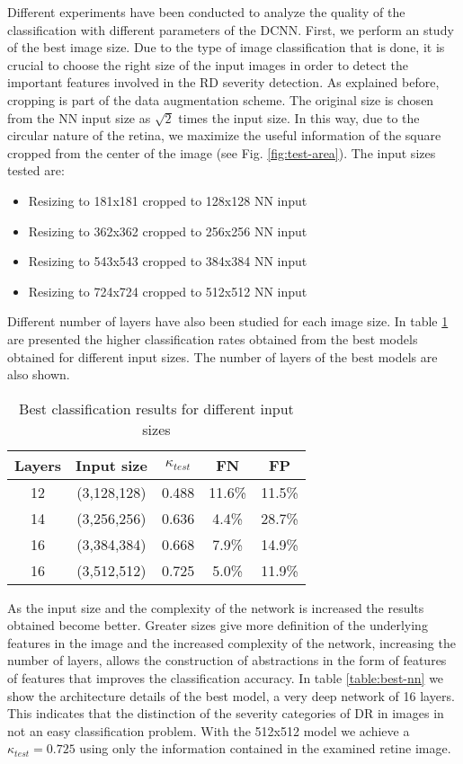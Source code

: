 Different experiments have been conducted to analyze the quality of the classification with different parameters of the DCNN. First, we perform an study of the best image size. Due to the type of image classification that is done, it is crucial to choose the right size of the input images in order to detect the important features involved in the RD severity detection. As explained before, cropping is part of the data augmentation scheme. The original size is chosen from the NN input size as $\sqrt{2}$ times the input size. In this way, due to the circular nature of the retina, we maximize the useful information of the square cropped from the center of the image (see Fig. \ref{fig:test-area}). The input sizes tested are:

\begin{itemize}
	\item Resizing to 181x181 cropped to 128x128 NN input
	\item Resizing to 362x362 cropped to 256x256 NN input
	\item Resizing to 543x543 cropped to 384x384 NN input
	\item Resizing to 724x724 cropped to 512x512 NN input
\end{itemize}

Different number of layers have also been studied for each image size.
In table \ref{table-results} are presented the higher classification rates obtained from the best models obtained for different input sizes. The number of layers of the best models are also shown.

\begin{table}[ht!]
	\centering
	\begin{tabular}{c c c c c} 
		\hline
		Layers & Input size & $\kappa_{test}$ & FN & FP \\ [0.5ex] 
		\hline\hline
		12 & (3,128,128) & 0.488 & 11.6\% & 11.5\% \\ 
		14 & (3,256,256) & 0.636 & 4.4\% & 28.7\% \\ 
		16 & (3,384,384) & 0.668 & 7.9\%& 14.9\%\\ 
		16 & (3,512,512) & 0.725 & 5.0\% & 11.9\% \\ 
		\hline
	\end{tabular}
	\caption{Best classification results for different input sizes}
	\label{table-results}
\end{table}

As the input size and the complexity of the network is increased the results obtained become better. Greater sizes give more definition of the underlying features in the image and the increased complexity of the network, increasing the number of layers, allows the construction of abstractions in the form of features of features that improves the classification accuracy. In table \ref{table:best-nn} we show the architecture details of the best model, a very deep network of 16 layers. This indicates that the distinction of the severity categories of DR in images in not an easy classification problem. With the 512x512 model we achieve a $\kappa_{test} = 0.725$ using only the information contained in the examined retine image.

